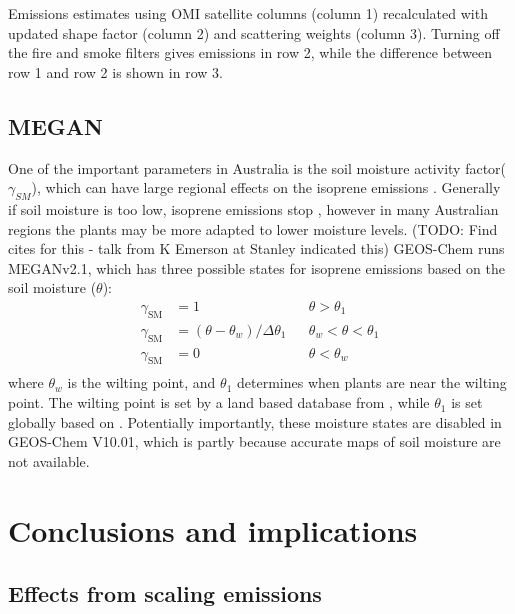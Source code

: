     {Emissions estimates using OMI satellite columns (column 1) recalculated with updated shape factor (column 2) and scattering weights (column 3). Turning off the fire and smoke filters gives emissions in row 2, while the difference between row 1 and row 2 is shown in row 3.}
    {\label{BioIsop:Uncertainty:Fire:fig_emiss_without_fire_filter}}
    
  
  \subsection{MEGAN}

    One of the important parameters in Australia is the soil moisture activity factor($\gamma_{SM}$), which can have large regional effects on the isoprene emissions \parencite{Sindelarova2014,Bauwens2016}.
    Generally if soil moisture is too low, isoprene emissions stop \parencite{Pegoraro2004,Niinemets2010}, however in many Australian regions the plants may be more adapted to lower moisture levels. (TODO: Find cites for this - talk from K Emerson at Stanley indicated this)
    GEOS-Chem runs MEGANv2.1, which has three possible states for isoprene emissions based on the soil moisture ($\theta$):
    \begin{align*}
    \gamma_\mathrm{SM} & = 1 && \theta > \theta_1 \\
    \gamma_\mathrm{SM} & = (\theta-\theta_w)/\Delta\theta_1  && \theta_w < \theta < \theta_1 \\
    \gamma_\mathrm{SM} & = 0 && \theta < \theta_w \\
    \end{align*}
    where $\theta_w$ is the wilting point, and $\theta_1$ determines when plants are near the wilting point.
    The wilting point is set by a land based database from \textcite{Chen2001}, while $\theta_1$ is set globally based on \textcite{Pegoraro2004}.
    Potentially importantly, these moisture states are disabled in GEOS-Chem V10.01, which is partly because accurate maps of soil moisture are not available.
    
    
\section{Conclusions and implications}
  \label{BioIsop:Conclusions}
  
  \subsection{Effects from scaling emissions}
  
